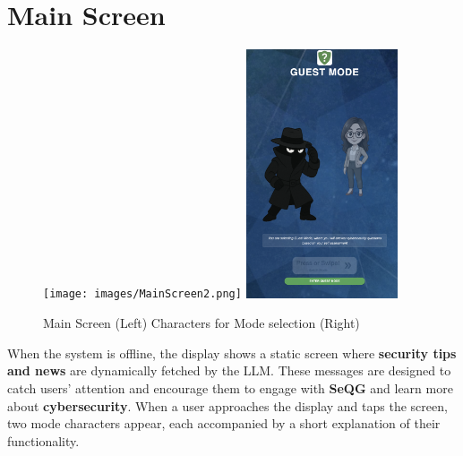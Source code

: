 \section{Main Screen}
\begin{figure}[H]
    \centering
    \texttt{[image: images/MainScreen2.png]}
    \includegraphics[width=0.4\textwidth]{images/MainScreenCharacters.png}
    \caption{Main Screen (Left) Characters for Mode selection (Right)}
\end{figure}

When the system is offline, the display shows a static screen where \textbf{security tips and news} 
are dynamically fetched by the LLM. These messages are designed to catch users’ attention and encourage 
them to engage with \textbf{SeQG} and learn more about \textbf{cybersecurity}.
When a user approaches the display and taps the screen, two mode characters appear, each accompanied 
by a short explanation of their functionality.